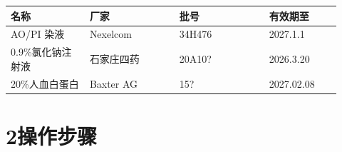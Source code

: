 \documentclass[UTF8,10pt,a4paper,fontset=fandol]{ctexart}
\newcommand{\fieldvalue}[1]{#1}
\newcommand{\handwritten}[1]{#1}
\begin{document}
\begin{tabular}{|p{0.22\linewidth}|p{0.25\linewidth}|p{0.25\linewidth}|p{0.20\linewidth}|}
\hline
名称 & 厂家 & 批号 & 有效期至 \\
\hline
AO/PI 染液 & Nexelcom &
\fieldvalue{\handwritten{34H476}} &
\fieldvalue{\handwritten{2027.1.1}} \\
\hline
0.9\%氯化钠注射液 & 石家庄四药 &
\fieldvalue{\handwritten{20A10?}} &
\fieldvalue{\handwritten{2026.3.20}} \\
\hline
20\%人血白蛋白 & Baxter AG &
\fieldvalue{\handwritten{15?}} &
\fieldvalue{\handwritten{2027.02.08}} \\
\hline
\end{tabular}

\section*{2\quad 操作步骤}
\end{document}
